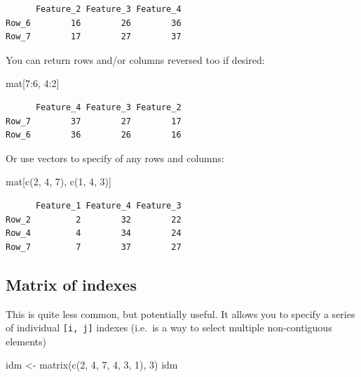 \documentclass[
]{book}
\newenvironment{Shaded}{\begin{snugshade}}{\end{snugshade}}
\newcommand{\DecValTok}[1]{\textcolor[rgb]{0.00,0.00,0.81}{#1}}
\newcommand{\FunctionTok}[1]{\textcolor[rgb]{0.00,0.00,0.00}{#1}}
\newcommand{\NormalTok}[1]{#1}
\newcommand{\OtherTok}[1]{\textcolor[rgb]{0.56,0.35,0.01}{#1}}
\newcommand{\SpecialCharTok}[1]{\textcolor[rgb]{0.00,0.00,0.00}{#1}}
\begin{document}
\begin{verbatim}
      Feature_2 Feature_3 Feature_4
Row_6        16        26        36
Row_7        17        27        37
\end{verbatim}

You can return rows and/or columns reversed too if desired:

\begin{Shaded}
\begin{Highlighting}[]
\NormalTok{mat[}\DecValTok{7}\SpecialCharTok{:}\DecValTok{6}\NormalTok{, }\DecValTok{4}\SpecialCharTok{:}\DecValTok{2}\NormalTok{]}
\end{Highlighting}
\end{Shaded}

\begin{verbatim}
      Feature_4 Feature_3 Feature_2
Row_7        37        27        17
Row_6        36        26        16
\end{verbatim}

Or use vectors to specify of any rows and columns:

\begin{Shaded}
\begin{Highlighting}[]
\NormalTok{mat[}\FunctionTok{c}\NormalTok{(}\DecValTok{2}\NormalTok{, }\DecValTok{4}\NormalTok{, }\DecValTok{7}\NormalTok{), }\FunctionTok{c}\NormalTok{(}\DecValTok{1}\NormalTok{, }\DecValTok{4}\NormalTok{, }\DecValTok{3}\NormalTok{)]}
\end{Highlighting}
\end{Shaded}

\begin{verbatim}
      Feature_1 Feature_4 Feature_3
Row_2         2        32        22
Row_4         4        34        24
Row_7         7        37        27
\end{verbatim}

\hypertarget{matrix-of-indexes}{%
\subsection{Matrix of indexes}\label{matrix-of-indexes}}

This is quite less common, but potentially useful. It allows you to specify a series of individual \texttt{{[}i,\ j{]}} indexes (i.e.~is a way to select multiple non-contiguous elements)

\begin{Shaded}
\begin{Highlighting}[]
\NormalTok{idm }\OtherTok{\textless{}{-}} \FunctionTok{matrix}\NormalTok{(}\FunctionTok{c}\NormalTok{(}\DecValTok{2}\NormalTok{, }\DecValTok{4}\NormalTok{, }\DecValTok{7}\NormalTok{, }\DecValTok{4}\NormalTok{, }\DecValTok{3}\NormalTok{, }\DecValTok{1}\NormalTok{), }\DecValTok{3}\NormalTok{)}
\NormalTok{idm}
\end{Highlighting}
\end{Shaded}
\end{document}
